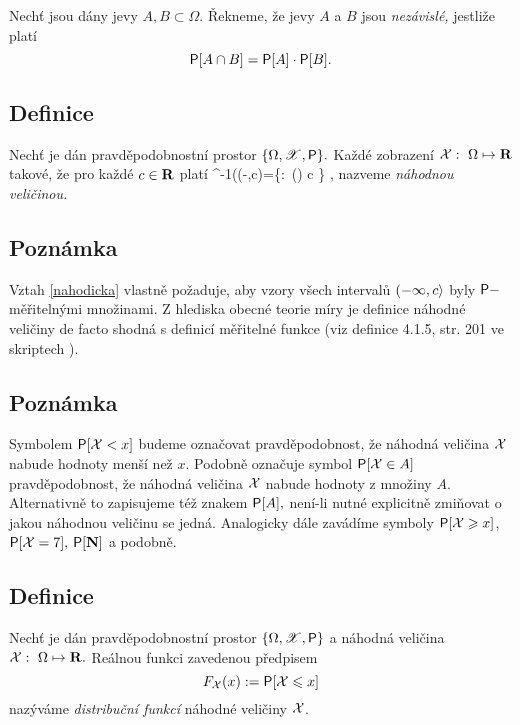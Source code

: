 Nech\v t jsou d\'any jevy $A,B\subset\Omega.$ \v Rekneme, \v ze jevy $A$ a $B$ jsou \emph{nez\'avisl\'e,} jestli\v ze plat\'i $$\mbox{\sf P}[A \cap B]=\mbox{\sf P}[A] \cdot \mbox{\sf P}[B].$$


\subsection{Definice}\label{nahodna velicina}

Nech\v t je d\'an pravd\v epodobnostn\'i prostor $\{\Omega,\mathscr{X},\mbox{\sf P}\}.$ Ka\v zd\'e zobrazen\'i ${\mathcal X}:~\Omega \mapsto {\mathbf R}$ takov\'e, \v ze pro ka\v zd\'e $c\in{\mathbf R}$ plat\'i
%
\BE \X^{-1}\bigl((-\infty,c\ra\bigr)=\bigl\{\omega\in\Omega:~\X(\omega) \leq c \bigr\} \in {}, \label{nahodicka} \EE
%
nazveme \emph{n\'ahodnou veli\v cinou.}


\subsection{Poznámka}

Vztah \eqref{nahodicka} vlastn\v e po\v zaduje, aby vzory v\v sech interval\r u $(-\infty,c\rangle$ byly $\mbox{\sf P}-$m\v e\v riteln\'ymi mno\v zinami. Z hlediska obecn\'e teorie m\'iry je definice n\'ahodn\'e veli\v ciny de facto shodn\'a s definic\'i m\v e\v riteln\'e funkce (viz definice 4.1.5, str. 201 ve skriptech \cite{Krbalek_MAB4}).

\subsection{Pozn\'amka}
Symbolem $\mbox{\sf P}[{\mathcal X}<x]$ budeme ozna\v covat pravděpodobnost, že náhodná veličina ${\mathcal X}$ nabude hodnoty menší než $x.$ Podobn\v e ozna\v cuje symbol $\mbox{\sf P}[{\mathcal X}\in A]$ pravděpodobnost, že náhodná veličina ${\mathcal X}$ nabude hodnoty z mno\v ziny $A.$ Alternativn\v e to zapisujeme t\'e\v z znakem $\mbox{\sf P}[A],$ nen\'i-li nutn\'e explicitn\v e zmi\v novat o jakou n\'ahodnou veli\v cinu se jedn\'a. Analogicky dále zavádíme symboly $\mbox{\sf P}[{\mathcal X} \geqslant x]$, $\mbox{\sf P}[{\mathcal X}=7],$ $\mbox{\sf P}[{\mathbf N}]$ a podobn\v e.

\subsection{Definice}
Nech\v t je d\'an pravd\v epodobnostn\'i prostor $\{\Omega,\mathscr{X},\mbox{\sf P}\}$ a n\'ahodn\'a veli\v cina ${\mathcal X}:~\Omega \mapsto {\mathbf R}.$ Re\'alnou funkci zavedenou předpisem $$F_{\mathcal X}(x) := \mbox{\sf P}[{\mathcal X} \leqslant x]$$ naz\'yv\'ame \emph{distribu\v cn\'i funkcí} náhodné veličiny ${\mathcal X}$.

